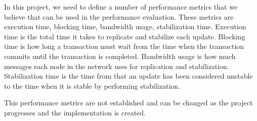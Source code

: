 \begin{description}
	In this project, we need to define a number of performance metrics that we believe that can be used in the performance evaluation. These metrics are execution time, blocking time, bandwidth usage, stabilization time. Execution time is the total time it takes to replicate and stabilize each update. Blocking time is how long a transaction must wait from the time when the transaction commits until the transaction is completed. Bandwidth usage is how much messages each node in the network uses for replication and stabilization. Stabilization time is the time from that an update has been considered unstable to the time when it is stable by performing stabilization.  

This performance metrics are not established and can be changed as the project progresses and the implementation is created.
 
\end{description}
